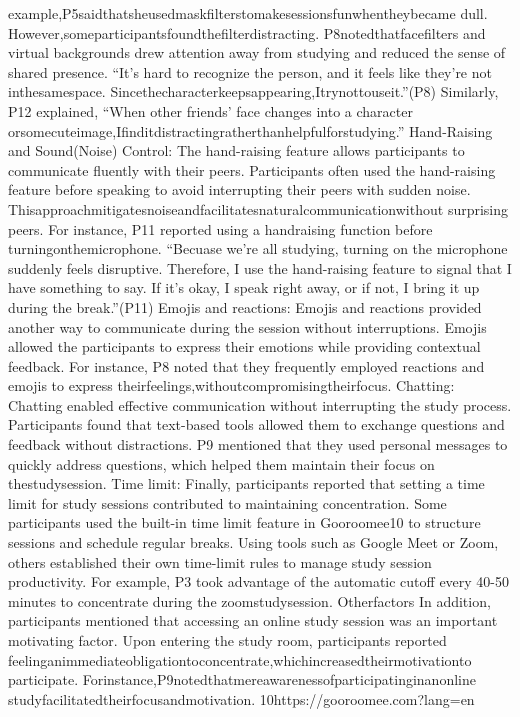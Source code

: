 \documentclass[12pt]{ctexart}
\begin{document}
example,P5saidthatsheusedmaskfilterstomakesessionsfunwhentheybecame
dull.
However,someparticipantsfoundthefilterdistracting. P8notedthatfacefilters
and virtual backgrounds drew attention away from studying and reduced the sense
of shared presence. “It’s hard to recognize the person, and it feels like they’re not
inthesamespace. Sincethecharacterkeepsappearing,Itrynottouseit.”(P8)
Similarly, P12 explained, “When other friends’ face changes into a character
orsomecuteimage,Ifinditdistractingratherthanhelpfulforstudying.”
Hand-Raising and Sound(Noise) Control: The hand-raising feature allows
participants to communicate fluently with their peers. Participants often used the
hand-raising feature before speaking to avoid interrupting their peers with sudden
noise. Thisapproachmitigatesnoiseandfacilitatesnaturalcommunicationwithout
surprising peers. For instance, P11 reported using a handraising function before
turningonthemicrophone.
“Becuase we’re all studying, turning on the microphone suddenly feels
disruptive. Therefore, I use the hand-raising feature to signal that I have
something to say. If it’s okay, I speak right away, or if not, I bring it up during the
break.”(P11)
Emojis and reactions: Emojis and reactions provided another way to
communicate during the session without interruptions. Emojis allowed the
participants to express their emotions while providing contextual feedback. For
instance, P8 noted that they frequently employed reactions and emojis to express
theirfeelings,withoutcompromisingtheirfocus.
Chatting: Chatting enabled effective communication without interrupting the
study process. Participants found that text-based tools allowed them to exchange
questions and feedback without distractions. P9 mentioned that they used personal
messages to quickly address questions, which helped them maintain their focus on
thestudysession.
Time limit: Finally, participants reported that setting a time limit for study
sessions contributed to maintaining concentration. Some participants used the
built-in time limit feature in Gooroomee10 to structure sessions and schedule
regular breaks. Using tools such as Google Meet or Zoom, others established their
own time-limit rules to manage study session productivity. For example, P3 took
advantage of the automatic cutoff every 40-50 minutes to concentrate during the
zoomstudysession.
Otherfactors
In addition, participants mentioned that accessing an online study session was an
important motivating factor. Upon entering the study room, participants reported
feelinganimmediateobligationtoconcentrate,whichincreasedtheirmotivationto
participate. Forinstance,P9notedthatmereawarenessofparticipatinginanonline
studyfacilitatedtheirfocusandmotivation.
10https://gooroomee.com?lang=en
\end{document}

